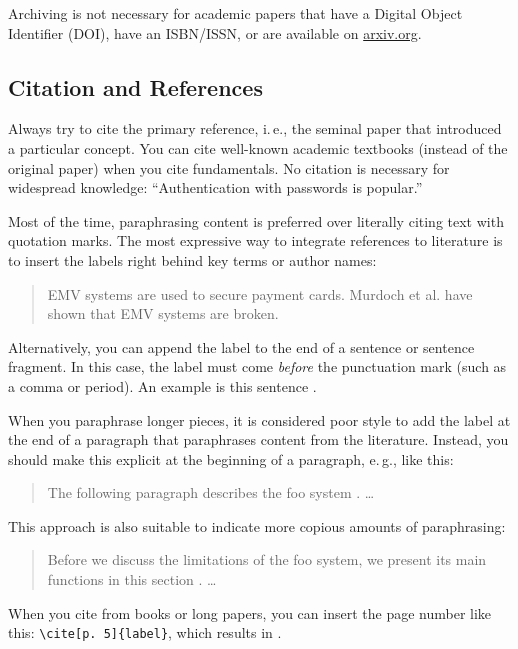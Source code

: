 Archiving is not necessary for academic papers that have a Digital Object Identifier (DOI), have an ISBN/ISSN, or are available on \url{arxiv.org}.


\subsection{Citation and References}

Always try to cite the primary reference, i.\,e., the seminal paper that introduced a particular concept. You can cite well-known academic textbooks (instead of the original paper) when you cite fundamentals. No citation is necessary for widespread knowledge: ``Authentication with passwords is popular.''

Most of the time, paraphrasing content is preferred over literally citing text with quotation marks. The most expressive way to integrate references to literature is to insert the labels right behind key terms or author names:
\begin{quote}
  EMV systems \cite{anderson_ross_emv:_2014} are used to secure payment cards. Murdoch et al. \cite{murdoch_steven_j._chip_2010} have shown that EMV systems are broken.
\end{quote}

Alternatively, you can append the label to the end of a sentence or sentence fragment. In this case, the label must come \emph{before} the punctuation mark (such as a comma or period). An example is this sentence \cite{Hintz02}.

When you paraphrase longer pieces, it is considered poor style to add the label at the end of a paragraph that paraphrases content from the literature. Instead, you should make this explicit at the beginning of a paragraph, e.\,g., like this:
\begin{quote}
  The following paragraph describes the foo system \cite{kou_weidong_secure_2003}. …
\end{quote}

This approach is also suitable to indicate more copious amounts of paraphrasing:
\begin{quote}
  Before we discuss the limitations of the foo system, we present its main functions in this section \cite{kou_weidong_secure_2003}. …
\end{quote}

When you cite from books or long papers, you can insert the page number like this: \verb|\cite[p. 5]{label}|, which results in \cite[p. 5]{kou_weidong_secure_2003}.

